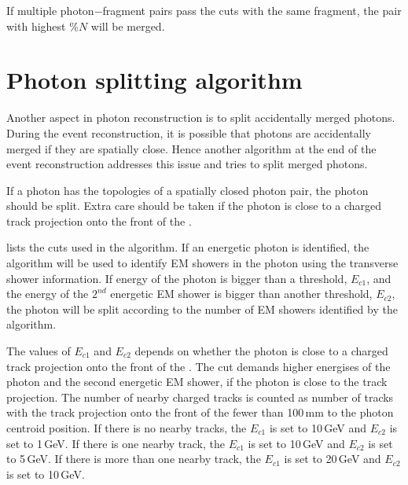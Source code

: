 If multiple photon$-$fragment pairs pass the cuts with the same fragment, the pair with highest $\%{N}$ will be merged.



\section{Photon splitting algorithm}
\label{sec:photonSplitting}


Another aspect in photon reconstruction is to split accidentally merged photons. During the event reconstruction, it is possible that photons are accidentally merged if they are spatially close. Hence another algorithm at the end of the event reconstruction addresses this issue and tries to split merged photons.

If a photon has the  topologies of a spatially closed photon pair, the photon should be split. Extra care should be taken if the photon is close to a charged track projection onto the front of the \ECAL.


 lists the cuts used in the algorithm.  If an energetic photon is identified, the \peakFinding algorithm will  be used to identify EM showers in the photon using the transverse shower information. If energy of the photon is bigger than a threshold, $E_{c1}$, and the energy of the $2^{nd}$ energetic EM shower is bigger than another threshold, $E_{c2}$, the photon will be split according to the number of EM showers identified by the \peakFinding algorithm.

The values of $E_{c1}$ and $E_{c2}$ depends on whether the photon is close to a charged track projection onto the front of the \ECAL. The cut demands higher energises of the photon and the second energetic EM shower, if the photon is close to the track projection. The number of nearby charged tracks is counted as number of tracks with the track projection onto the front of the \ECAL fewer than 100\,mm to the photon centroid position. If there is no nearby tracks, the $E_{c1}$ is set to 10\,GeV and $E_{c2}$ is set to 1\,GeV. If there is one nearby track, the $E_{c1}$ is set to 10\,GeV and $E_{c2}$ is set to 5\,GeV. If there is more than one nearby track, the $E_{c1}$ is set to 20\,GeV and $E_{c2}$ is set to 10\,GeV.

